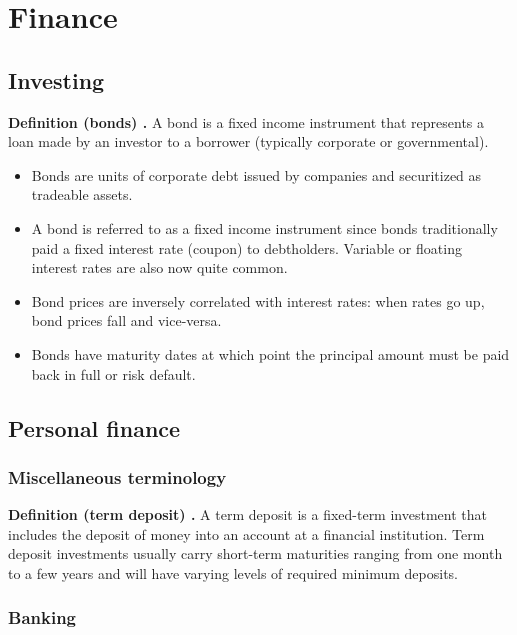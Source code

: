 \chapter{Finance}

\section{Investing}
\begin{shaded}
\textbf{Definition (bonds) \cite{investopedia_bond}.} A bond is a fixed income instrument that represents a loan made by an investor to a borrower (typically corporate or governmental).
\begin{itemize}
	\item Bonds are units of corporate debt issued by companies and securitized as tradeable assets.
	\item A bond is referred to as a fixed income instrument since bonds traditionally paid a fixed interest rate (coupon) to debtholders. Variable or floating interest rates are also now quite common.
	\item Bond prices are inversely correlated with interest rates: when rates go up, bond prices fall and vice-versa.
	\item Bonds have maturity dates at which point the principal amount must be paid back in full or risk default.
\end{itemize}
\end{shaded}

\section{Personal finance}

\subsection{Miscellaneous terminology}
\begin{shaded}
\textbf{Definition (term deposit) \cite{investopedia_term_deposit}.} A term deposit is a fixed-term investment that includes the deposit of money into an account at a financial institution. Term deposit investments usually carry short-term maturities ranging from one month to a few years and will have varying levels of required minimum deposits.
\end{shaded}

\subsection{Banking}

